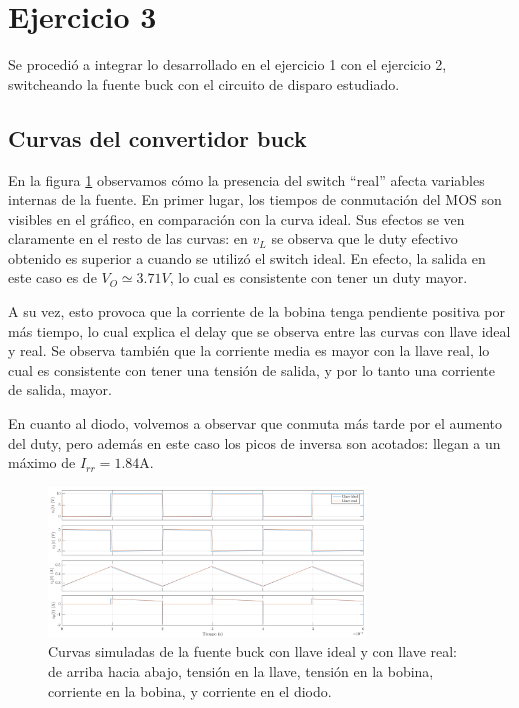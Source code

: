\documentclass[e4_tp1_main.tex]{subfiles}
\begin{document}
\section{Ejercicio 3}

Se procedi\'o a integrar lo desarrollado en el ejercicio 1 con el ejercicio 2, switcheando la fuente buck con el circuito de disparo estudiado. 

\subsection{Curvas del convertidor buck}

En la figura \ref{fig:curvas3} observamos c\'omo la presencia del switch ``real'' afecta variables internas de la fuente. En primer lugar, los tiempos de conmutaci\'on del MOS son visibles en el gr\'afico, en comparaci\'on con la curva ideal. Sus efectos se ven claramente en el resto de las curvas: en $v_L$ se observa que le duty efectivo obtenido es superior a cuando se utiliz\'o el switch ideal. En efecto, la salida en este caso es de $V_O\simeq3.71V$, lo cual es consistente con tener un duty mayor.

A su vez, esto provoca que la corriente de la bobina tenga pendiente positiva por m\'as tiempo, lo cual explica el delay que se observa entre las curvas con llave ideal y real. Se observa tambi\'en que la corriente media es mayor con la llave real, lo cual es consistente con tener una tensi\'on de salida, y por lo tanto una corriente de salida, mayor.

En cuanto al diodo, volvemos a observar que conmuta m\'as tarde por el aumento del duty, pero adem\'as en este caso los picos de inversa son acotados: llegan a un m\'aximo de $I_{rr}=1.84$A.

\begin{figure}[ht]
	\centering
	\includegraphics[width=0.75\textwidth]{images/ej3/curvas3.png}
	\caption{Curvas simuladas de la fuente buck con llave ideal y con llave real: de arriba hacia abajo, tensi\'on en la llave, tensi\'on en la bobina, corriente en la bobina, y corriente en el diodo.}
	\label{fig:curvas3}
\end{figure}
\end{document}
